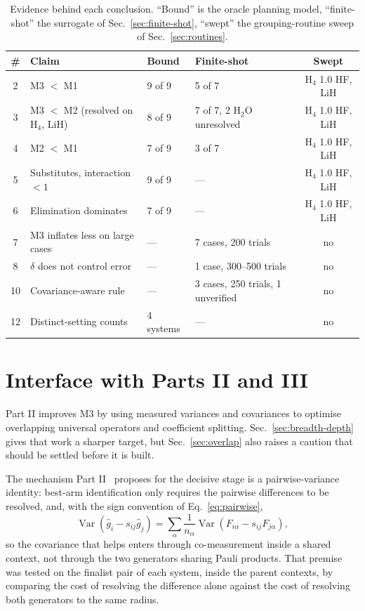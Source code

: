 \documentclass[10pt]{article}
\newcommand{\Var}{\operatorname{Var}}
\begin{document}
\begin{table}[!htbp]
\centering
\scriptsize
\caption{Evidence behind each conclusion. ``Bound'' is the oracle planning model, ``finite-shot'' the surrogate of Sec.~\ref{sec:finite-shot}, ``swept'' the grouping-routine sweep of Sec.~\ref{sec:routines}.}
\label{tab:evidence}
\begin{tabular}{clllc}
\toprule
\# & Claim & Bound & Finite-shot & Swept \\
\midrule
2  & M3 $<$ M1                        & 9 of 9  & 5 of 7 & H$_4$ 1.0 HF, LiH \\
3  & M3 $<$ M2 (resolved on H$_4$, LiH) & 8 of 9  & 7 of 7, 2 H$_2$O unresolved & H$_4$ 1.0 HF, LiH \\
4  & M2 $<$ M1                        & 7 of 9  & 3 of 7 & H$_4$ 1.0 HF, LiH \\
5  & Substitutes, interaction $<1$    & 9 of 9  & ---    & H$_4$ 1.0 HF, LiH \\
6  & Elimination dominates            & 7 of 9  & ---    & H$_4$ 1.0 HF, LiH \\
7  & M3 inflates less on large cases  & ---     & 7 cases, 200 trials & no \\
8  & $\delta$ does not control error  & ---     & 1 case, 300--500 trials & no \\
10 & Covariance-aware rule            & ---     & 3 cases, 250 trials, 1 unverified & no \\
12 & Distinct-setting counts          & 4 systems & ---  & no \\
\bottomrule
\end{tabular}
\end{table}

\section{Interface with Parts II and III}

Part II improves M3 by using measured variances and covariances to optimise overlapping universal operators and coefficient splitting. Sec.~\ref{sec:breadth-depth} gives that work a sharper target, but Sec.~\ref{sec:overlap} also raises a caution that should be settled before it is built.

The mechanism Part II~\cite{PartII} proposes for the decisive stage is a pairwise-variance identity: best-arm identification only requires the pairwise differences to be resolved, and, with the sign convention of Eq.~\eqref{eq:pairwise},
\begin{equation}
  \Var\!\left(\widehat g_i-s_{ij}\widehat g_j\right)
  =\sum_\alpha\frac{1}{n_\alpha}\Var\!\left(F_{i\alpha}-s_{ij}F_{j\alpha}\right),
\end{equation}
so the covariance that helps enters through co-measurement inside a shared context, not through the two generators sharing Pauli products. That premise was tested on the finalist pair of each system, inside the parent contexts, by comparing the cost of resolving the difference alone against the cost of resolving both generators to the same radius.
\end{document}
